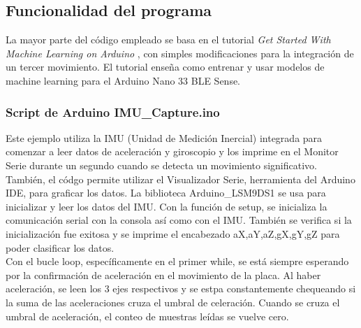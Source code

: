 

\subsection{Funcionalidad del programa}

La mayor parte del código empleado se basa en el tutorial \textit{Get Started With Machine Learning on Arduino} \cite{arduino}, con simples modificaciones para la integración de un tercer movimiento.  El tutorial enseña como entrenar y usar modelos de machine learning para el Arduino Nano 33 BLE Sense.  


    \subsubsection{Script de Arduino IMU\_Capture.ino}
    
        Este ejemplo utiliza la IMU (Unidad de Medición Inercial) integrada para comenzar a leer datos de aceleración y giroscopio y los imprime en el Monitor Serie durante un segundo cuando se detecta un movimiento significativo. También, el códgo permite utilizar el Visualizador Serie, herramienta del Arduino IDE, para graficar los datos. La biblioteca Arduino\_LSM9DS1 se usa para inicializar y leer los datos del IMU. Con la función de setup, se inicializa la comunicación serial con la consola así como con el IMU. También se verifica si la inicialización fue exitosa y se imprime el encabezado aX,aY,aZ,gX,gY,gZ para poder clasificar los datos.   \\

        Con el bucle loop, específicamente en el primer while, se está siempre esperando por la confirmación de aceleración en el movimiento de la placa. Al haber aceleración, se leen los 3 ejes respectivos y se estpa constantemente chequeando si la suma de las aceleraciones cruza el umbral de celeración. Cuando se cruza el umbral de aceleración, el conteo de muestras leídas se vuelve cero. \\

